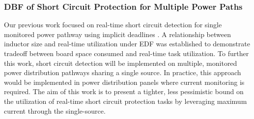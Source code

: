 \subsubsection{DBF of Short Circuit Protection for Multiple Power Paths}

Our previous work focused on real-time short circuit detection for single monitored power pathway using implicit deadlines \cite{willcock_trading_2017}.
A relationship between inductor size and real-time utilization under EDF was established to demonstrate tradeoff between board space consumed and real-time task utilization.
To further this work, short circuit detection will be implemented on multiple, monitored power distribution pathways sharing a single source.
In practice, this approach would be implemented in power distribution panels where current monitoring is required.
The aim of this work is to present a tighter, less pessimistic bound on the utilization of real-time short circuit protection tasks by leveraging maximum current through the single-source.

